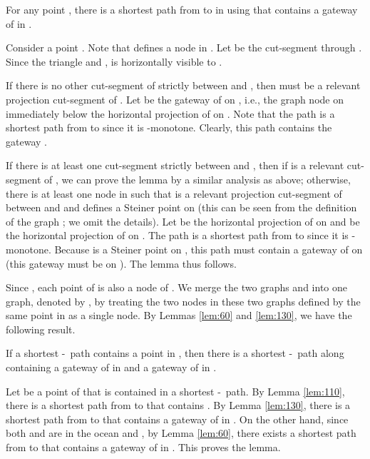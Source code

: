 \documentclass[english,runningheads,11pt]{llncs}
\def\st{-}
\newenvironment{proof}{\noindent {\textbf{Proof:}}\rm}{\hfill \rm}
\begin{document}
\begin{lemma}\label{lem:130}
For any point ,
there is a shortest path from  to
 in  using  that contains a gateway of  in .
\end{lemma}
\begin{proof}
Consider a point . Note that
 defines a node in . Let  be the cut-segment
through . Since the triangle  and
,  is horizontally visible to .

If there is no other cut-segment of  strictly
between  and , then  must be a relevant projection
cut-segment of . Let  be the gateway of  on , i.e., the
graph node on  immediately below the horizontal
projection  of  on .
Note that the path
 is a shortest path from 
to  since it is -monotone. Clearly, this path contains
the gateway .

If there is at least one cut-segment strictly between  and ,
then if  is a relevant cut-segment of , we can prove the
lemma by a similar analysis as above; otherwise,
there is at least one node  in  such that
 is a relevant projection cut-segment of  between  and 
and  defines a Steiner point on  (this can be seen
from the definition of the graph ; we omit the
details). Let  be the horizontal projection
of  on  and  be the horizontal projection
of  on . The path
 is a
shortest path from  to  since it is -monotone. Because
 is a Steiner point on , this
path must contain a gateway of  on  (this gateway must be
on ).
The lemma thus follows.
\end{proof}

Since , each
point of  is also a node of . We merge
the two graphs  and  into one graph, denoted by ,
by treating the two nodes in these two graphs
defined by the same point in  as a single node.
By Lemmas \ref{lem:60} and
\ref{lem:130}, we have the following result.


\begin{lemma}\label{lem:140}
If a shortest \st\ path contains a point in ,
then there is a shortest \st\ path along  containing
a gateway of  in  and a gateway of  in
.
\end{lemma}
\begin{proof}
Let  be a point of  that is
contained in a shortest \st\ path. By Lemma \ref{lem:110}, there is a
shortest path from  to  that contains . By Lemma
\ref{lem:130}, there is a shortest path from  to  that contains
a gateway of  in . On the other hand, since both 
and  are in the ocean  and ,
by Lemma \ref{lem:60}, there exists
a shortest path from  to  that contains a gateway of  in
.  This proves the lemma.
\end{proof}
\end{document}
